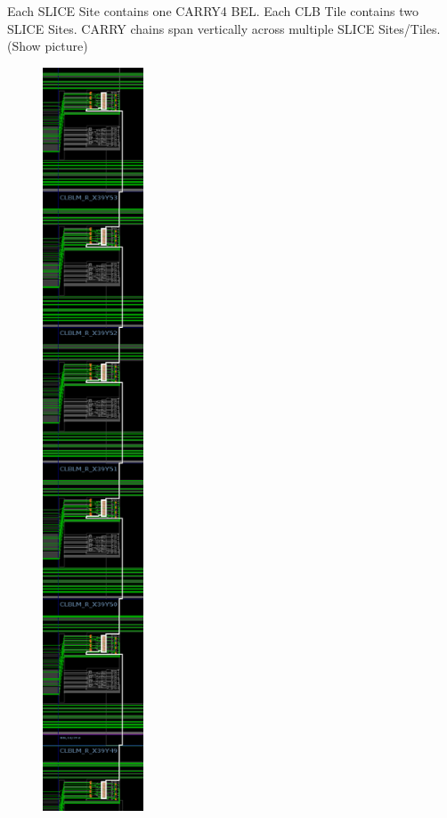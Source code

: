 \documentclass[twocolumn]{article}
\begin{document}
            Each SLICE Site contains one CARRY4 BEL.
            Each CLB Tile contains two SLICE Sites.
            CARRY chains span vertically across multiple SLICE Sites/Tiles. (Show picture)
            \begin{figure}
                \centering
                \includegraphics[width=3.0cm]{figures/carry_chain_routes.png}

\end{figure}
\end{document}
